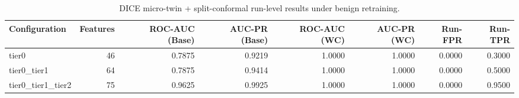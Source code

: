 \begin{table}[t]
\centering
\caption{DICE micro-twin + split-conformal run-level results under benign retraining.}
\label{tab:dice_full_overall}
\footnotesize
\begin{tabular}{lrrrrrrr}
\toprule
Configuration & Features & ROC-AUC (Base) & AUC-PR (Base) & ROC-AUC (WC) & AUC-PR (WC) & Run-FPR & Run-TPR \\
\midrule
tier0 & 46 & 0.7875 & 0.9219 & 1.0000 & 1.0000 & 0.0000 & 0.3000 \\
tier0_tier1 & 64 & 0.7875 & 0.9414 & 1.0000 & 1.0000 & 0.0000 & 0.5000 \\
tier0_tier1_tier2 & 75 & 0.9625 & 0.9925 & 1.0000 & 1.0000 & 0.0000 & 0.9500 \\
\bottomrule
\end{tabular}

\end{table}
